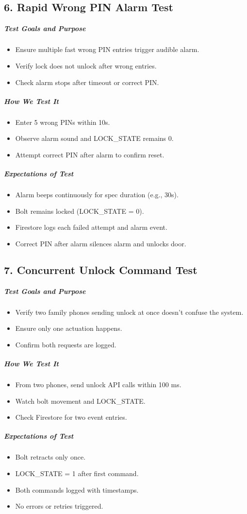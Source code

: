 \subsection*{6. Rapid Wrong PIN Alarm Test}
\subparagraph{Test Goals and Purpose}
\begin{itemize}
    \item Ensure multiple fast wrong PIN entries trigger audible alarm.
    \item Verify lock does not unlock after wrong entries.
    \item Check alarm stops after timeout or correct PIN.
\end{itemize}
\subparagraph{How We Test It}
\begin{itemize}
    \item Enter 5 wrong PINs within 10s.
    \item Observe alarm sound and LOCK\_STATE remains 0.
    \item Attempt correct PIN after alarm to confirm reset.
\end{itemize}
\subparagraph{Expectations of Test}
\begin{itemize}
    \item Alarm beeps continuously for spec duration (e.g., 30s).
    \item Bolt remains locked (LOCK\_STATE = 0).
    \item Firestore logs each failed attempt and alarm event.
    \item Correct PIN after alarm silences alarm and unlocks door.
\end{itemize}

\subsection*{7. Concurrent Unlock Command Test}
\subparagraph{Test Goals and Purpose}
\begin{itemize}
    \item Verify two family phones sending unlock at once doesn't confuse the system.
    \item Ensure only one actuation happens.
    \item Confirm both requests are logged.
\end{itemize}
\subparagraph{How We Test It}
\begin{itemize}
    \item From two phones, send unlock API calls within 100 ms.
    \item Watch bolt movement and LOCK\_STATE.
    \item Check Firestore for two event entries.
\end{itemize}
\subparagraph{Expectations of Test}
\begin{itemize}
    \item Bolt retracts only once.
    \item LOCK\_STATE = 1 after first command.
    \item Both commands logged with timestamps.
    \item No errors or retries triggered.
\end{itemize}

